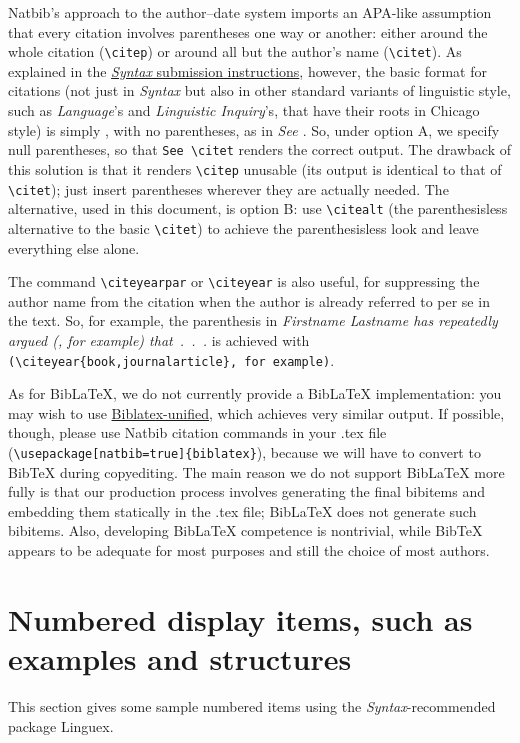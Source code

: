 \documentclass[letterpaper,12pt, twoside]{article}
\begin{document}
Natbib's approach to the author--date system imports an APA-like assumption that every citation involves parentheses one way or another: either around the whole citation (\verb|\citep|) or around all but the author's name (\verb|\citet|). As explained in the \href{https://docs.google.com/document/d/1T0zHwq2b53VnqF18c8PKd-W_FWKqhKF0gkbBndoxj28/edit?usp=sharing}{\emph{Syntax} submission instructions}, however, the basic format for citations (not just in \emph{Syntax} but also in other standard variants of linguistic style, such as \emph{Language}'s and \emph{Linguistic Inquiry}'s, that have their roots in Chicago style) is simply \emph{\citealt{journalarticle}}, with no parentheses, as in \emph{See \citealt{journalarticle}}. So, under option A, we specify null parentheses, so that \verb|See \citet| renders the correct output. The drawback of this solution is that it renders \verb|\citep| unusable (its output is identical to that of \verb|\citet|); just insert parentheses wherever they are actually needed. The alternative, used in this document, is option B: use \verb|\citealt| (the parenthesisless alternative to the basic \verb|\citet|) to achieve the parenthesisless look and leave everything else alone.

The command \verb|\citeyearpar| or \verb|\citeyear| is also useful, for suppressing the author name from the citation when the author is already referred to per se in the text. So, for example, the parenthesis in \emph{Firstname Lastname has repeatedly argued (\citeyear{book, journalarticle}, for example) that~.~.~.} is achieved with \verb|(\citeyear{book,journalarticle}, for example)|.

As for BibLaTeX, we do not currently provide a BibLaTeX implementation: you may wish to use \href{https://ctan.org/pkg/biblatex-unified}{Biblatex-unified}, which achieves very similar output. If possible, though, please use  Natbib citation commands in your .tex file (\verb|\usepackage[natbib=true]{biblatex}|), because we will have to convert to BibTeX during copyediting. The main reason we do not support BibLaTeX more fully is that our production process involves generating the final bibitems and embedding them statically in the .tex file; BibLaTeX does not generate such bibitems. Also, developing BibLaTeX competence is nontrivial, while BibTeX appears to be adequate for most purposes and still the choice of most authors.



\section{Numbered display items, such as examples and structures}\label{secexs}
This section gives some sample numbered items using the \emph{Syntax}-recommended package {Linguex}. 
\end{document}
